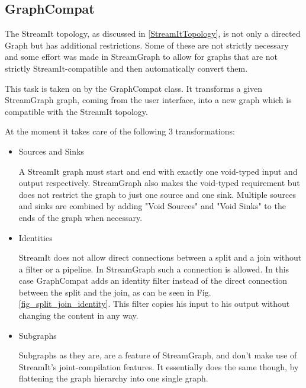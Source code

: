 \documentclass[journal]{IEEEtran}
\begin{document}
\subsection{GraphCompat}

\noindent The StreamIt topology, as discussed in \ref{StreamItTopology}, is not
only a directed Graph but has additional restrictions. Some of these are not
strictly necessary and some effort was made in StreamGraph to allow for graphs
that are not strictly StreamIt-compatible and then automatically convert them.

This task is taken on by the GraphCompat class. It transforms a given
StreamGraph graph, coming from the user interface, into a new graph which
is compatible with the StreamIt topology.

At the moment it takes care of the following 3 transformations:

\begin{itemize}
\item Sources and Sinks

  A StreamIt graph must start and end with exactly one void-typed input and
  output respectively. StreamGraph also makes the void-typed requirement but
  does not restrict the graph to just one source and one sink. Multiple sources
  and sinks are combined by adding "Void Sources" and "Void Sinks" to the ends
  of the graph when necessary.\\

\item Identities

  StreamIt does not allow direct connections between a split and a join without
  a filter or a pipeline. In StreamGraph such a connection is allowed. In this
  case GraphCompat adds an identity filter instead of the direct connection
  between the split and the join, as can be seen in Fig.
  \ref{fig_split_join_identity}. This filter copies his input to his output
  without changing the content in any way.\\

\item Subgraphs

  Subgraphs as they are, are a feature of StreamGraph, and don't make use of
  StreamIt's joint-compilation features. It essentially does the same though, by
  flattening the graph hierarchy into one single graph.\\

\end{itemize}
\end{document}
